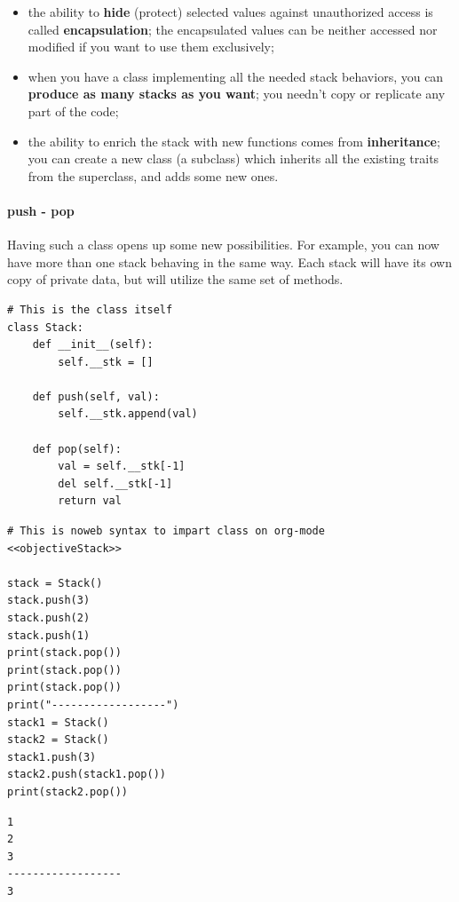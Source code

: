 \documentclass[11pt]{article}
\begin{document}
\begin{itemize}
\item the ability to \textbf{hide} (protect) selected values against unauthorized
access is called \textbf{encapsulation}; the encapsulated values can be
neither accessed nor modified if you want to use them exclusively;
\item when you have a class implementing all the needed stack behaviors,
you can \textbf{produce as many stacks as you want}; you needn’t copy or
replicate any part of the code;
\item the ability to enrich the stack with new functions comes from
\textbf{inheritance}; you can create a new class (a subclass) which
inherits all the existing traits from the superclass, and adds some
new ones.
\end{itemize}

\paragraph{push - pop}
\label{sec:org060c742}
Having such a class opens up some new possibilities. For example, you
can now have more than one stack behaving in the same way. Each stack
will have its own copy of private data, but will utilize the same set
of methods.

\begin{verbatim}
# This is the class itself 
class Stack:
	def __init__(self):
		self.__stk = []

	def push(self, val):
		self.__stk.append(val)

	def pop(self):
		val = self.__stk[-1]
		del self.__stk[-1]
		return val

\end{verbatim}


\begin{verbatim}
# This is noweb syntax to impart class on org-mode
<<objectiveStack>>

stack = Stack()
stack.push(3)
stack.push(2)
stack.push(1)
print(stack.pop())
print(stack.pop())
print(stack.pop())
print("------------------")
stack1 = Stack()
stack2 = Stack()
stack1.push(3)
stack2.push(stack1.pop())
print(stack2.pop())
\end{verbatim}

\begin{verbatim}
1
2
3
------------------
3
\end{verbatim}

\newpage
\end{document}
